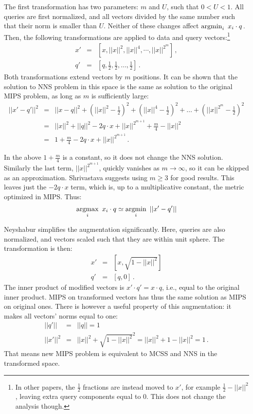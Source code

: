 The first transformation has two parameters: $m$ and $U$, such that $0 < U < 1$. All queries
are first normalized, and all vectors divided by the same number such that
their norm is smaller than $U$. Neither of these changes affect
$ \argmin_{i}\ x_i \cdot q\,.$
Then, the following transformations are applied to data
and query vectors:\footnote{In other papers, the $\frac{1}{2}$ fractions are
instead moved to $x'$, for example $\frac{1}{2} - ||x||^2$, leaving extra
query components equal to 0. This does not change the analysis though.}
\begin{eqnarray*}
x' & = & [x, ||x||^2, ||x||^4, \cdots, ||x||^{2^m}] \,, \\
q' & = & [q, \frac{1}{2}, \frac{1}{2}, \dots, \frac{1}{2}] \,. 
\end{eqnarray*}
Both transformations extend vectors by $m$ positions. It can be shown that
the solution to NNS problem in this space is the same as solution to the original
MIPS problem, as long as $m$ is sufficiently large:
\begin{eqnarray*}
||x' - q'||^2 & = & ||x - q||^2 +
\left (||x||^2 - \frac{1}{2} \right )^2 + \left (||x||^4 - \frac{1}{2} \right )^2 + \dots + 
\left (||x||^{2^m} - \frac{1}{2} \right )^2 \\
& = & ||x||^2 + ||q||^2 - 2 q \cdot x + ||x||^{2^{m+1}} + \frac{m}{4} - ||x||^2 \\
& = & 1 + \frac{m}{4} - 2 q \cdot x + ||x||^{2^{m+1}} \,.
\end{eqnarray*}

In the above $1 + \frac{m}{4} $ is a constant, so it does not change the NNS solution. Similarly  the last term, 
$||x||^{2^{m+1}}$, quickly vanishes as $m \to \infty$, so it can be skipped
as an approximation. Shrivastava suggests using $m \ge 3$ for good results.
This leaves just the $ - 2 q \cdot x $ term, which is, up to a multiplicative
constant, the metric optimized in MIPS.
Thus:
$$
\operatorname*{argmax}_{i}\ x_i \cdot q \simeq \operatorname*{argmin}_{i}\ ||x' - q'||
$$

Neyshabur simplifies the augmentation significantly. Here, queries are also
normalized, and vectors scaled such that they are within unit sphere. The
transformation is then:
\begin{eqnarray*}
x' & = & [x, \sqrt{1 - ||x||^2}] \\
q' & = &  [q, 0] \,.
\end{eqnarray*}
The inner product of modified vectors is $x' \cdot q' = x \cdot q$, i.e., equal
to the original inner product. MIPS on transformed vectors has thus the same
solution as MIPS on original ones. There is however a useful property of this
augmentation: it makes all vectors' norms equal to one: 
\begin{eqnarray*}
||q'|| & = & ||q|| = 1 \\
||x'||^2 & = & ||x||^2 + \sqrt{1 - ||x||^2}^2 = ||x||^2 + 1 - ||x||^2 = 1 \,. 
\end{eqnarray*}
That means new MIPS problem is equivalent to MCSS and NNS in the transformed
space.


